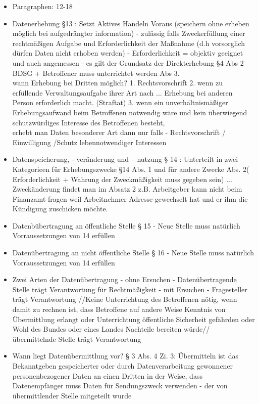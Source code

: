 \documentclass[a4paper,10pt]{scrartcl}
\begin{document}
\begin{itemize}
 \item Paragraphen: 12-18
 \item Datenerhebung §13 : Setzt Aktives Handeln Voraus (speichern ohne erheben möglich bei aufgedrängter information) -
 zulässig falls Zweckerfüllung einer rechtmäßigen Aufgabe und Erforderlichkeit der Maßnahme (d.h vorsorglich dürfen Daten nicht
 erhoben werden) - Erforderlichkeit = objektiv geeignet und auch angemessen - es gilt der Grundsatz der Direkterhebung §4 Abs 2 BDSG + Betroffener muss unterrichtet
 werden Abs 3.\\ 
 wann Erhebung bei Dritten möglich? 1. Rechtsvorschrift 2.  wenn zu erfüllende Verwaltungsaufgabe ihrer Art nach ... Erhebung bei anderen Person erforderlich macht.
 (Straftat) 3. wenn ein unverhältnismäßiger Erhebungsaufwand beim Betroffenen notwendig wäre und kein überwiegend schutzwürdiges Interesse des Betroffenen besteht, \\
 erhebt man Daten besonderer Art dann nur falls - Rechtsvorschrift / Einwilligung /Schutz lebennotwendiger Interessen

 \item Datenspeicherung, - veränderung und – nutzung § 14 : Unterteilt in zwei Kategorieen für Erhebungszwecke §14 Abs. 1 und für andere Zwecke Abs. 2( Erforderlichkeit 
 + Wahrung der Zweckmäßigkeit muss gegeben sein) ... Zweckänderung findet man im Absatz 2 z.B. Arbeitgeber kann nicht beim Finanzamt fragen
 weil Arbeitnehmer Adresse gewechselt hat und er ihm die Kündigung zuschicken möchte.
 \item Datenbübertragung an öffentliche Stelle § 15 - Neue Stelle muss natürlich Vorraussetzungen von 14 erfüllen
 \item Datenübertragung an nicht öffentliche Stelle § 16 - Neue Stelle muss natürlich Vorraussetzungen von 14 erfüllen
 \item Zwei Arten der Datenübertragung - ohne Ersuchen - Datenübertragende Stelle trägt Verantwortung für Rechtmäßigkeit - mit Ersuchen - 
 Fragesteller trägt Verantwortung //Keine Unterrichtung des Betroffenen nötig, wenn damit zu rechnen 
ist, dass Betroffene auf andere Weise Kenntnis von Übermittlung 
erlangt oder Unterrichtung öffentliche Sicherheit gefährden oder Wohl 
des Bundes oder eines Landes Nachteile bereiten würde// übermittelnde Stelle trägt Verantwortung
 \item Wann liegt Datenübermittlung vor? § 3 Abs. 4 Zi. 3: Übermitteln ist das Bekanntgeben gespeicherter oder 
durch Datenverarbeitung gewonnener personenbezogener 
Daten an einen Dritten in der Weise, dass \\   Datenempfänger muss Daten für Sendungszweck verwenden - der von übermittlender Stelle
mitgeteilt wurde
                                                           

\end{itemize}
\end{document}
